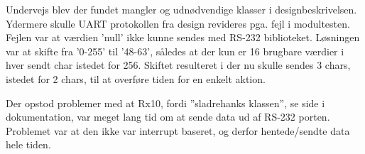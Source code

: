 Undervejs blev der fundet mangler og udnødvendige klasser i designbeskrivelsen. Ydermere skulle UART protokollen fra design revideres pga. fejl i modultesten. Fejlen var at værdien 'null' ikke kunne sendes med RS-232 biblioteket. Løsningen var at skifte fra '0-255' til '48-63', således at der kun er 16 brugbare værdier i hver sendt char istedet for 256. Skiftet resulteret i der nu skulle sendes 3 chars, istedet for 2 chars, til at overføre tiden for en enkelt aktion.

Der opstod problemer med at Rx10, fordi ''sladrehanks klassen'', se side \pageref{P-Rx} i dokumentation, var meget lang tid om at sende data ud af RS-232 porten. Problemet var at den ikke var interrupt baseret, og derfor hentede/sendte data hele tiden. 